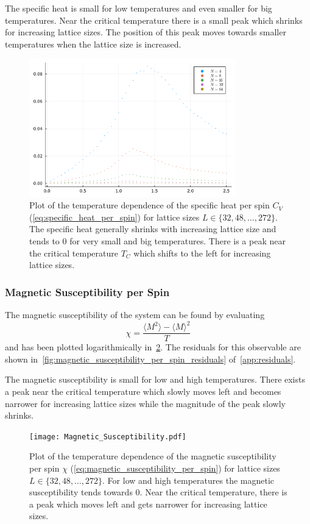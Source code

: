 The specific heat is small for low temperatures and even smaller for big temperatures. Near the critical temperature there is a small peak which shrinks for increasing lattice sizes. The position of this peak moves towards smaller temperatures when the lattice size is increased. 
\begin{figure}[!htb]
	\centering
	\includegraphics[width=0.8\textwidth]{Specific_Heat.pdf}
	\caption[Temperature dependence of the specific heat per spin $C_V$]{Plot of the temperature dependence of the specific heat per spin $C_V$ (\cref{eq:specific_heat_per_spin}) for lattice sizes $L\in\{32, 48, \dots, 272\}$. The specific heat generally shrinks with increasing lattice size and tends to $0$ for very small and big temperatures. There is a peak near the critical temperature $T_C$ which shifts to the left for increasing lattice sizes.}
	\label{fig:specific_heat}
\end{figure}

\subsubsection{Magnetic Susceptibility per Spin}\label{sec:magnetic_susceptibility_per_spin}
The magnetic susceptibility of the system can be found by evaluating
\begin{equation}\label{eq:magnetic_susceptibility_per_spin}
	\chi = \frac{\langle M^2 \rangle - {\langle M \rangle}^2}{T}
\end{equation}
and has been plotted logarithmically in~\cref{fig:magnetic_susceptibility}. The residuals for this observable are shown in~\cref{fig:magnetic_susceptibility_per_spin_residuals} of~\cref{app:residuals}.

The magnetic susceptibility is small for low and high temperatures. There exists a peak near the critical temperature which slowly moves left and becomes narrower for increasing lattice sizes while the magnitude of the peak slowly shrinks.
\begin{figure}[!htb]
	\centering
	\texttt{[image: Magnetic\_Susceptibility.pdf]}
	\caption[Temperature dependence of the magnetic susceptibility per spin $\chi$]{Plot of the temperature dependence of the magnetic susceptibility per spin $\chi$ (\cref{eq:magnetic_susceptibility_per_spin}) for lattice sizes $L\in\{32, 48, \dots, 272\}$. For low and high temperatures the magnetic susceptibility tends towards $0$. Near the critical temperature, there is a peak which moves left and gets narrower for increasing lattice sizes.}
	\label{fig:magnetic_susceptibility}
\end{figure}

